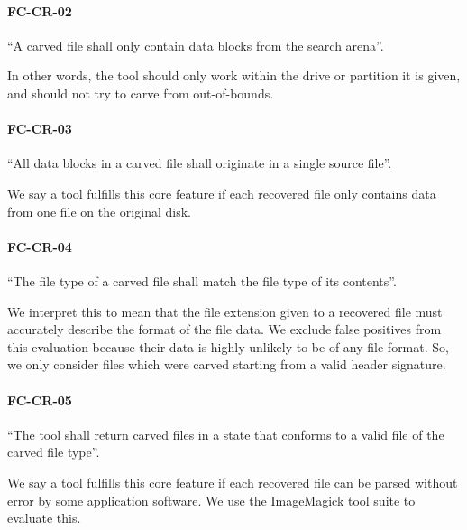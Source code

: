  \paragraph{FC-CR-02} ``A carved file shall only contain data blocks from the search arena''.~\cite{carving_standards}
 
 In other words, the tool should only work within the drive or partition it is given, and should not try to carve from out-of-bounds.
 
 \paragraph{FC-CR-03} ``All data blocks in a carved file shall originate in a single source file''.~\cite{carving_standards}
 
 We say a tool fulfills this core feature if each recovered file only contains data from one file on the original disk.
 
 \paragraph{FC-CR-04} ``The file type of a carved file shall match the file type of its contents''.~\cite{carving_standards}
 
 We interpret this to mean that the file extension given to a recovered file must accurately describe the format of the file data. We exclude false positives from this evaluation because their data is highly unlikely to be of any file format. So, we only consider files which were carved starting from a valid header signature.
 
 \paragraph{FC-CR-05} ``The tool shall return carved files in a state that conforms to a valid file of the carved file type''.~\cite{carving_standards}
 
 We say a tool fulfills this core feature if each recovered file can be parsed without error by some application software.
 We use the ImageMagick tool suite to evaluate this.
